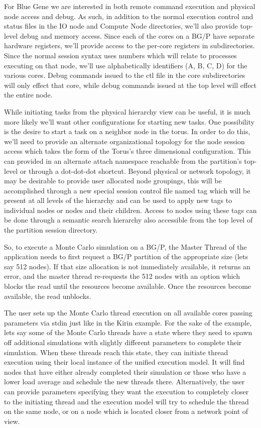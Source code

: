 \documentclass{sig-alternate}
\begin{document}
For Blue Gene we are interested in both remote command execution and
physical node access and debug.  As such, in addition to the normal execution
control and status files in the IO node and Compute Node directories, we'll
also provide top-level debug and memory access.  Since each of the cores on
a BG/P have separate hardware registers, we'll provide access to the per-core
registers in subdirectories.  Since the normal session syntax uses numbers
which will relate to processes executing on that node, we'll use alphabetically
identifiers (A, B, C, D) for the various cores.  Debug commands issued to the
ctl file in the core subdirectories will only effect that core, while debug
commands issued at the top level will effect the entire node.

While initiating tasks from the physical hierarchy view can be useful, it is
much more likely we'll want other configurations for starting new tasks.
One possibility is the desire to start a task on a neighbor node in the
torus.  In order to do this, we'll need to provide an alternate organizational
topology for the node session access which takes the form of the Torus's
three dimensional configuration.  This can provided in an alternate attach
namespace reachable from the partition's top-level or through a dot-dot-dot
shortcut. Beyond physical or network topology, it may be desirable to provide
user allocated node groupings, this will be accomplished through a new special
session control file named tag which will be present at all levels of the
hierarchy and can be used to apply new tags to individual nodes or nodes and
their children.  Access to nodes using these tags can be done through a 
semantic search hierarchy also accessible from the top level of the 
partition session directory.

So, to execute a Monte Carlo simulation on a BG/P, the Master Thread of
the application needs to first request a BG/P partition of the appropriate
size (lets say 512 nodes).  If that size allocation is not immediately
available, it returns an error, and the master thread re-requests the
512 nodes with an option which blocks the read until the resources become
available.  Once the resources become available, the read unblocks.

The user sets up the Monte Carlo thread execution on all available
cores passing parameters via stdin just like in the Kirin example.
For the sake of the example, lets say some of the Monte Carlo threads
have a state where they need to spawn off additional simulations with
slightly different parameters to complete their simulation.  When these
threads reach this state, they can initiate thread execution using their
local instance of the unified execution model.  It will find nodes that
have either already completed their simulation or those who have a lower
load average and schedule the new threads there.  Alternatively, the user
can provide parameters specifying they want the execution to completely closer
to the initiating thread and the execution model will try to schedule the
thread on the same node, or on a node which is located closer from a network
point of view.
\end{document}
